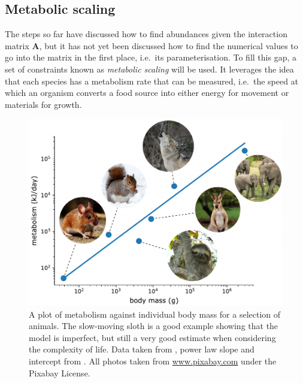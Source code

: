 


\subsection{Metabolic scaling}
\label{sec:metabolism}
The steps so far have discussed how to find abundances given the interaction matrix $\mathbf{A}$, but it has not yet been discussed how to find the numerical values to go into the matrix in the first place, i.e.\ its parameterisation.
To fill this gap, a set of constraints known as \emph{metabolic scaling} will be used.
It leverages the idea that each species has a metabolism rate that can be measured, i.e.\ the speed at which an organism converts a food source into either energy for movement or materials for growth.

\begin{figure}
    \centering
    \includegraphics[width=.8\textwidth]{joy/metabolism.pdf}
    \caption[A plot of metabolism against individual body mass]{A plot of metabolism against individual body mass for a selection of animals. The slow-moving sloth is a good example showing that the model is imperfect, but still a very good estimate when considering the complexity of life. Data taken from \cite{Nagy1999}, power law slope and intercept from \cite[Fig.~2]{Brown2004}. All photos taken from \url{www.pixabay.com} under the Pixabay License.}
    \label{fig:metabolism}
\end{figure}

